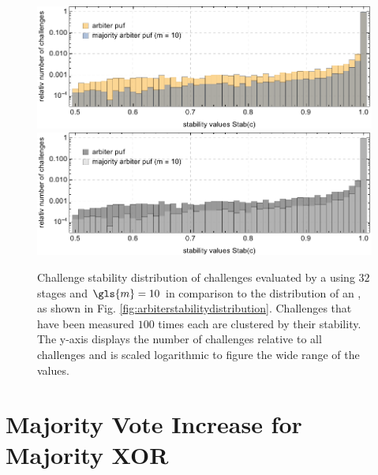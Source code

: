 \begin{figure}[!htp]
\ifx{}\undefined
{}
\else
	\if{}
\centering
\includegraphics[width=1.00\textwidth]{images/comparison-arbiter-stability-distribution-majority-arbiter-stability-distribution.pdf}
	\else
\includegraphics[width=1.00\textwidth]{images/comparison-arbiter-stability-distribution-majority-arbiter-stability-distribution_mono.pdf}
    \fi
\fi
\caption[Challenge stability distribution of a \mpuf]{Challenge stability distribution of challenges evaluated by a \mpuf using $32$ stages and $\gls{m} = 10$ in comparison to the distribution of an \apuf, as shown in Fig. \ref{fig:arbiterstabilitydistribution}. Challenges that have been measured $100$ times each are clustered by their stability. The y-axis displays the number of challenges relative to all challenges and is scaled logarithmic to figure the wide range of the values.} 
\label{fig:comparisonarbiterstabilitydistributionmajorityarbiterstabilitydistribution}
\end{figure}


\section{Majority Vote Increase for Majority \acs{XOR} \apufs}
\label{sec:majorityvotegrowth}

